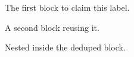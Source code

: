\documentclass{article}
\begin{document}
\begin{theorem}\label{thm:a}
The first block to claim this label.
\end{theorem}

\begin{theorem}\label{thm:a}
A second block reusing it.
\begin{corollary}\label{cor:c}
Nested inside the deduped block.
\end{corollary}
\end{theorem}
\end{document}
